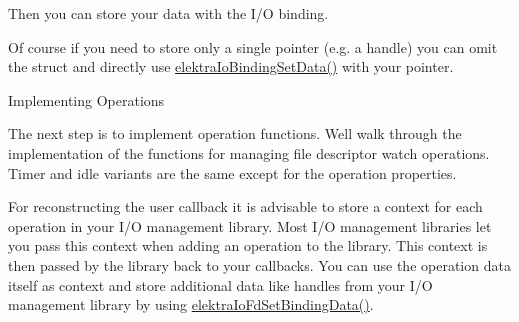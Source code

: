 \begin{DoxyCodeInclude}{0}
\DoxyCodeLine{}
\DoxyCodeLine{\{}
\DoxyCodeLine{        \textcolor{comment}{// Add additional members as required}}
\end{DoxyCodeInclude}
 Then you can store your data with the I/O binding.


\begin{DoxyCodeInclude}{0}
\DoxyCodeLine{        \textcolor{comment}{// Store binding relevant data in the interface}}
\DoxyCodeLine{        \{}
\DoxyCodeLine{        \}}
\end{DoxyCodeInclude}
 Of course if you need to store only a single pointer (e.\+g. a handle) you can omit the struct and directly use \mbox{\hyperlink{io_8c_a6021718783b36ca71bb465bc08a682cc}{elektra\+Io\+Binding\+Set\+Data()}} with your pointer.

\begin{DoxyParagraph}{Implementing Operations}

\end{DoxyParagraph}
The next step is to implement operation functions. We\textquotesingle{}ll walk through the implementation of the functions for managing file descriptor watch operations. Timer and idle variants are the same except for the operation properties.

For reconstructing the user callback it is advisable to store a context for each operation in your I/O management library. Most I/O management libraries let you pass this context when adding an operation to the library. This context is then passed by the library back to your callbacks. You can use the operation data itself as context and store additional data like handles from your I/O management library by using \mbox{\hyperlink{io_8c_ae02ec122aafa67b7dd92d9c3daa6499e}{elektra\+Io\+Fd\+Set\+Binding\+Data()}}.

